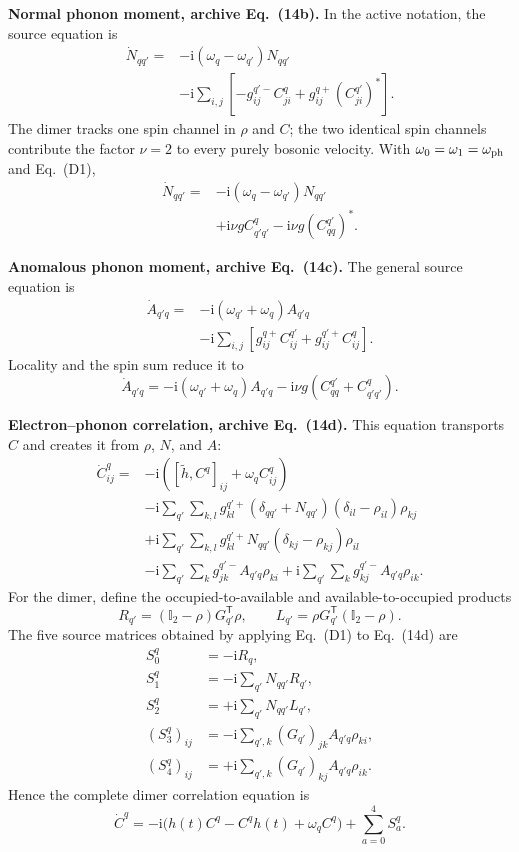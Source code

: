 \documentclass[10pt,letterpaper,twocolumn]{article}
\newcommand{\I}{\mathbb I}
\newcommand{\ii}{\mathrm i}
\begin{document}
\textbf{Normal phonon moment, archive Eq.~(14b).}
In the active notation, the source equation is
\[
\begin{aligned}
\dot N_{qq'}={}&-\ii(\omega_q-\omega_{q'})N_{qq'}\\
&-\ii\sum_{i,j}
\left[-g^{q'-}_{ij}C^q_{ji}
+g^{q+}_{ij}(C^{q'}_{ji})^\ast\right].
\end{aligned}
\tag{14b}
\]
The dimer tracks one spin channel in \(\rho\) and \(C\); the two identical
spin channels contribute the factor \(\nu=2\) to every purely bosonic
velocity.  With \(\omega_0=\omega_1=\omega_{\rm ph}\) and Eq.~(D1),
\[
\begin{aligned}
\dot N_{qq'}={}&-\ii(\omega_q-\omega_{q'})N_{qq'}\\
&+\ii\nu g C^q_{q'q'}
-\ii\nu g(C^{q'}_{qq})^\ast.
\end{aligned}
\tag{D14b}
\]

\textbf{Anomalous phonon moment, archive Eq.~(14c).}
The general source equation is
\[
\begin{aligned}
\dot A_{q'q}={}&-\ii(\omega_{q'}+\omega_q)A_{q'q}\\
&-\ii\sum_{i,j}
\left[g^{q+}_{ij}C^{q'}_{ij}
+g^{q'+}_{ij}C^q_{ij}\right].
\end{aligned}
\tag{14c}
\]
Locality and the spin sum reduce it to
\[
\dot A_{q'q}
=-\ii(\omega_{q'}+\omega_q)A_{q'q}
-\ii\nu g\left(C^{q'}_{qq}+C^q_{q'q'}\right).
\tag{D14c}
\]

\textbf{Electron--phonon correlation, archive Eq.~(14d).}
This equation transports \(C\) and creates it from \(\rho\), \(N\), and
\(A\):
{\footnotesize
\[
\begin{aligned}
\dot C^q_{ij}={}&-\ii\left(
[\widetilde h,C^q]_{ij}+\omega_qC^q_{ij}\right)\\
&-\ii\sum_{q'}\sum_{k,l}g^{q'+}_{kl}
(\delta_{qq'}+N_{qq'})(\delta_{il}-\rho_{il})\rho_{kj}\\
&+\ii\sum_{q'}\sum_{k,l}g^{q'+}_{kl}N_{qq'}
(\delta_{kj}-\rho_{kj})\rho_{il}\\
&-\ii\sum_{q'}\sum_k g^{q'-}_{jk}A_{q'q}\rho_{ki}
+\ii\sum_{q'}\sum_k g^{q'-}_{kj}A_{q'q}\rho_{ik}.
\end{aligned}
\tag{14d}
\]
}
For the dimer, define the occupied-to-available and
available-to-occupied products
\[
R_{q'}=(\I_2-\rho)G_{q'}^{\mathsf T}\rho,
\qquad
L_{q'}=\rho G_{q'}^{\mathsf T}(\I_2-\rho).
\tag{D2}
\]
The five source matrices obtained by applying Eq.~(D1) to Eq.~(14d) are
{\small
\[
\begin{aligned}
S_0^q&=-\ii R_q,\\
S_1^q&=-\ii\sum_{q'}N_{qq'}R_{q'},\\
S_2^q&=+\ii\sum_{q'}N_{qq'}L_{q'},\\
(S_3^q)_{ij}
&=-\ii\sum_{q',k}(G_{q'})_{jk}A_{q'q}\rho_{ki},\\
(S_4^q)_{ij}
&=+\ii\sum_{q',k}(G_{q'})_{kj}A_{q'q}\rho_{ik}.
\end{aligned}
\tag{D3}
\]
}
Hence the complete dimer correlation equation is
\[
\dot C^q
=-\ii\bigl(h(t)C^q-C^qh(t)+\omega_qC^q\bigr)
+\sum_{a=0}^{4}S_a^q.
\tag{D14d}
\]
\end{document}
